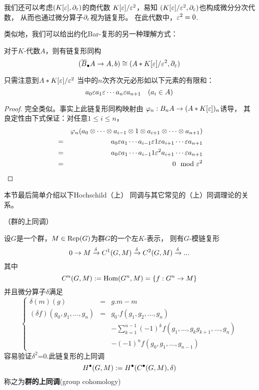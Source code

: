 我们还可以考虑$(K[\varepsilon],\partial_{\varepsilon})$的商代数
$K[\varepsilon]/\varepsilon^2$，易知
$(K[\varepsilon]/\varepsilon^2,\partial_{\varepsilon})$也构成微分分次代数，
从而也通过微分算子$\partial_{\varepsilon}$视为链复形。
在此代数中，$\varepsilon^2=0$.\vs

类似地，我们可以给出约化Bar-复形的另一种理解方式：

\begin{prop}
对于$K$-代数$A$，则有链复形同构
$$(\overline{B}_{\bullet} A\to A,b)\cong (A*K[\varepsilon]/\varepsilon^2,\partial_{\varepsilon})$$
\end{prop}

只需注意到$A*K[\varepsilon]/\varepsilon^2$
当中的$n$次齐次元必形如以下元素的有限和：
$$a_0\varepsilon a_1\varepsilon\cdots a_n\varepsilon a_{n+1}\quad (a_i\in A)$$

\begin{proof}
完全类似。事实上此链复形同构映射由
$\varphi_n:B_nA \to (A*K[\varepsilon])_n$诱导，
其良定性由下式保证：对任意$1\leq i\leq n$，
\begin{eqnarray*}
&&  \varphi_n(a_0\otimes \cdots\otimes a_{i-1}
    \otimes 1\otimes a_{i+1}\otimes\cdots\otimes a_{n+1})\\
&=& a_0\varepsilon a_1\cdots a_{i-1}\varepsilon1\varepsilon a_{i+1}\cdots\varepsilon a_{n+1}\\
&=& a_0\varepsilon a_1\cdots a_{i-1}1\varepsilon^2a_{i+1}\cdots\varepsilon a_{n+1}\\
&=& 0\mod{\varepsilon}^2
\end{eqnarray*}
\end{proof}

本节最后简单介绍以下Hochschild（上）
同调与其它常见的（上）同调理论的关系。

\begin{example}（群的上同调）%

设$G$是一个群，$M\in\operatorname{Rep}(G)$为群$G$的一个左$K$-表示，
则有$G$-模链复形
$$0\to M\xrightarrow{\delta}C^1(G,M)\xrightarrow{\delta}C^2(G,M)\xrightarrow{\delta}...$$
其中%
$$C^n(G,M):=\operatorname{Hom}(G^n,M)=\{f:G^n\to M\}$$
并且微分算子$\delta$满足%
$$\left\{\begin{array}{rcl}
\delta(m)(g)&=&g.m-m\\
(\delta f)(g_0,g_1,...,g_n)&=&
g_0.f(g_1,g_2,...,g_n)\\
&&-\sum\limits_{k=1}^{n-1}(-1)^kf(g_1,...,g_kg_{k+1},...,g_n)\\
&&-(-1)^nf(g_0,g_1,...,g_{n-1})
\end{array}\right.
$$
容易验证$\delta^2$=0.此链复形的上同调
$$H^{\bullet}(G,M):=H^{\bullet}(C^{\bullet}(G,M),\delta)$$
称之为\textbf{群的上同调}(group cohomology)
\end{example}

